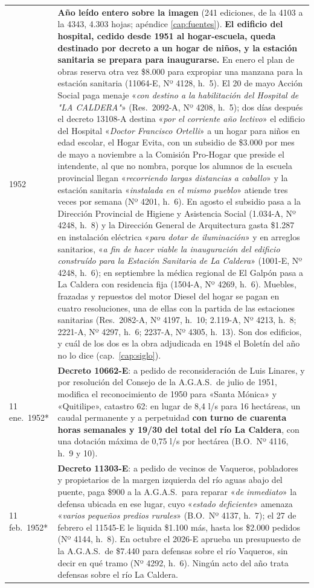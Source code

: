 \begin{longtable}{@{}p{2.7cm}p{10.3cm}@{}}
1952 & \textbf{Año leído entero sobre la imagen} (241 ediciones, de la 4103 a la 4343, 4.303 hojas; apéndice \ref{cap:fuentes}). \textbf{El edificio del hospital, cedido desde 1951 al hogar-escuela, queda destinado por decreto a un hogar de niños, y la estación sanitaria se prepara para inaugurarse.} En enero el plan de obras reserva otra vez \$8.000 para expropiar una manzana para la estación sanitaria (11064-E, Nº 4128, h.\ 5). El 20 de mayo Acción Social paga menaje «\textit{con destino a la habilitación del Hospital de "LA CALDERA"}» (Res.\ 2092-A, Nº 4208, h.\ 5); dos días después el decreto 13108-A destina «\textit{por el corriente año lectivo}» el edificio del Hospital «\textit{Doctor Francisco Ortelli}» a un hogar para niños en edad escolar, el Hogar Evita, con un subsidio de \$3.000 por mes de mayo a noviembre a la Comisión Pro-Hogar que preside el intendente, al que no nombra, porque los alumnos de la escuela provincial llegan «\textit{recorriendo largas distancias a caballo}» y la estación sanitaria «\textit{instalada en el mismo pueblo}» atiende tres veces por semana (Nº 4201, h.\ 6). En agosto el subsidio pasa a la Dirección Provincial de Higiene y Asistencia Social (1.034-A, Nº 4248, h.\ 8) y la Dirección General de Arquitectura gasta \$1.287 en instalación eléctrica «\textit{para dotar de iluminación}» y en arreglos sanitarios, «\textit{a fin de hacer viable la inauguración del edificio construído para la Estación Sanitaria de La Caldera}» (1001-E, Nº 4248, h.\ 6); en septiembre la médica regional de El Galpón pasa a La Caldera con residencia fija (1504-A, Nº 4269, h.\ 6). Muebles, frazadas y repuestos del motor Diesel del hogar se pagan en cuatro resoluciones, una de ellas con la partida de las estaciones sanitarias (Res.\ 2082-A, Nº 4197, h.\ 10; 2.119-A, Nº 4213, h.\ 8; 2221-A, Nº 4297, h.\ 6; 2237-A, Nº 4305, h.\ 13). Son dos edificios, y cuál de los dos es la obra adjudicada en 1948 el Boletín del año no lo dice (cap.\ \ref{cap:siglo}). \\
11 ene.\ 1952* & \textbf{Decreto 10662-E}: a pedido de reconsideración de Luis Linares, y por resolución del Consejo de la A.G.A.S.\ de julio de 1951, modifica el reconocimiento de 1950 para «Santa Mónica» y «Quitilipe», catastro 62: en lugar de 8,4 l/s para 16 hectáreas, un caudal permanente y a perpetuidad \textbf{con turno de cuarenta horas semanales y 19/30 del total del río La Caldera}, con una dotación máxima de 0,75 l/s por hectárea (B.O.\ Nº 4116, h.\ 9 y 10). \\
11 feb.\ 1952* & \textbf{Decreto 11303-E}: a pedido de vecinos de Vaqueros, pobladores y propietarios de la margen izquierda del río aguas abajo del puente, paga \$900 a la A.G.A.S.\ para reparar «\textit{de inmediato}» la defensa ubicada en ese lugar, cuyo «\textit{estado deficiente}» amenaza «\textit{varios pequeños predios rurales}» (B.O.\ Nº 4137, h.\ 7); el 27 de febrero el 11545-E le liquida \$1.100 más, hasta los \$2.000 pedidos (Nº 4144, h.\ 8). En octubre el 2026-E aprueba un presupuesto de la A.G.A.S.\ de \$7.440 para defensas sobre el río Vaqueros, sin decir en qué tramo (Nº 4292, h.\ 6). Ningún acto del año trata defensas sobre el río La Caldera. \\

\end{longtable}
